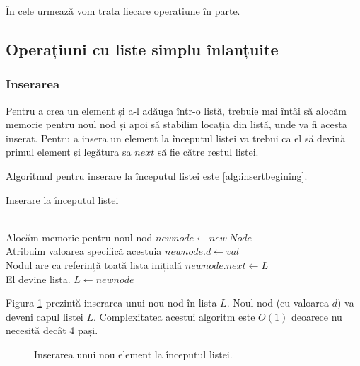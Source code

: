 În cele urmează vom trata fiecare operațiune în parte.

\subsection{Operațiuni cu liste simplu înlanțuite}

\subsubsection{Inserarea}

Pentru a crea un element și a-l adăuga într-o listă, trebuie mai întâi să alocăm memorie pentru noul nod și apoi să stabilim locația din listă, unde va fi acesta inserat.
Pentru a insera un element la începutul listei va trebui ca el să devină primul element și legătura sa $next$ să fie către restul listei.

Algoritmul pentru inserare la începutul listei este \ref{alg:insertbegining}.

\begin{algorithm}[H]
	\caption{Inserare la începutul listei}\label{alg:insertbegining}
	\begin{algorithmic}[1]
		 \\		
		\Comment Alocăm memorie pentru noul nod \hfill \tab{}\tab{}\tab{}
		\State $newnode \gets new \hspace{3pt} Node$\\
		\Comment Atribuim valoarea specifică acestuia \hfill \tab{}\tab{}\tab{}
		\State $newnode.d \gets val$\\
		\Comment Nodul are ca referință toată lista inițială  \hfill \tab{}\tab{}\tab{}
		\State $newnode.next \gets L$\\
		\Comment El devine lista. \hfill \tab{}\tab{}\tab{}\tab{}\tab{}
		\State $L \gets newnode$
		\EndProcedure
	\end{algorithmic}
\end{algorithm}

Figura \ref{fig:insertbeginning} prezintă inserarea unui nou nod în lista $L$. Noul nod (cu valoarea $d$) va deveni capul listei $L$. Complexitatea acestui algoritm este $O(1)$ deoarece nu necesită decât 4 pași.

\begin{figure}[H] 
	\centering	
	{
	}
	\caption{Inserarea unui nou element la începutul listei.} 
	\label{fig:insertbeginning}
\end{figure}


